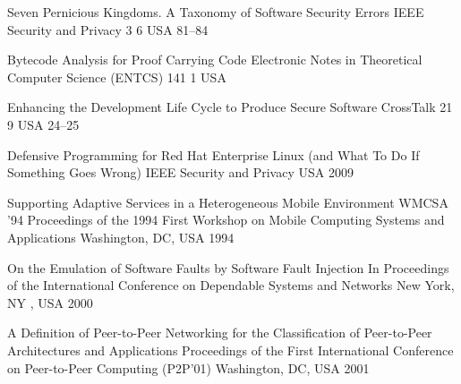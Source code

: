\begin{thebibliography}{9}
		{
			\BibAnd
			\BibAnd
			}
		{Seven Pernicious Kingdoms. A Taxonomy of Software Security Errors}
		{{IEEE} Security and Privacy}
		{3}
		{6}
		{USA}
		{}
		{81--84}
	
		{
			\BibAnd
			\BibAnd
			}
		{Bytecode Analysis for Proof Carrying Code}
		{Electronic Notes in Theoretical Computer Science ({ENTCS})}
		{141}
		{1}
		{USA}
		{}
		{}
	
		{}
		{Enhancing the Development Life Cycle to Produce Secure Software}
		{CrossTalk}
		{21}
		{9}
		{USA}
		{}
		{24--25}
	
		{}
		{Defensive Programming for {R}ed {H}at {E}nterprise {L}inux (and What To Do If Something Goes Wrong)}
		{{IEEE} Security and Privacy}
		{}
		{}
		{USA}
		{2009}
		{}
		

		{
			\BibAnd
			\BibAnd
			\BibAnd
			}
		{Supporting Adaptive Services in a Heterogeneous Mobile Environment}
		{WMCSA '94 Proceedings of the 1994 First Workshop on Mobile Computing Systems and Applications}
		{Washington, DC, USA}
		{1994}
		
		{
			\BibAnd
			\BibAnd
			}
		{On the Emulation of Software Faults by Software Fault Injection}
		{In Proceedings of the International Conference on Dependable Systems and Networks}
		{New York, NY , USA}
		{2000}
	
		{}
		{A Definition of Peer-to-Peer Networking for the Classification of Peer-to-Peer Architectures and Applications}
		{Proceedings of the First International Conference on Peer-to-Peer Computing ({P2P}'01)}
		{Washington, DC, USA}
		{2001}


\end{thebibliography}
